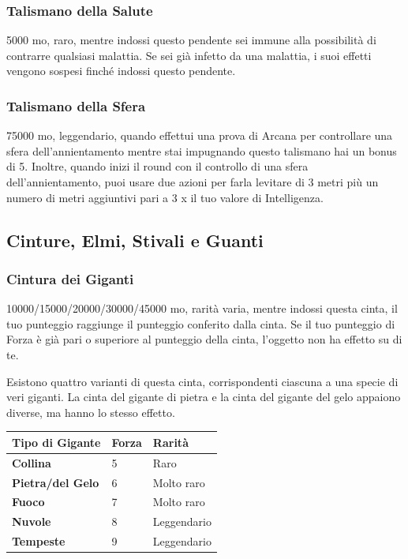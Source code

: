 \begin{multicols}{2}
\subsubsection*{Talismano della Salute}
5000 mo, raro, mentre indossi questo pendente sei immune alla possibilità di contrarre qualsiasi malattia. Se sei già infetto da una malattia, i suoi effetti vengono sospesi finché indossi questo pendente.

\subsubsection*{Talismano della Sfera}
75000 mo, leggendario, quando effettui una prova di Arcana per controllare una sfera dell'annientamento mentre stai impugnando questo talismano hai un bonus di 5. Inoltre, quando inizi il round con il controllo di una sfera dell'annientamento, puoi usare due azioni per farla levitare di 3 metri più un numero di metri aggiuntivi pari a 3 x il tuo valore di Intelligenza.

\subsection{Cinture, Elmi, Stivali e Guanti}

\subsubsection*{Cintura dei Giganti}

10000/15000/20000/30000/45000 mo, rarità varia, mentre indossi questa cinta, il tuo punteggio raggiunge il punteggio conferito dalla cinta. Se il tuo punteggio di Forza è già pari o superiore al punteggio della cinta, l'oggetto non ha effetto su di te.

Esistono quattro varianti di questa cinta, corrispondenti ciascuna a una specie di veri giganti. La cinta del gigante di pietra e la cinta del gigante del gelo appaiono diverse, ma hanno lo stesso effetto.

\medskip

\begin{tabular}{lll}
\textbf{Tipo di Gigante}& \textbf{Forza} &\textbf{Rarità}\\
\hline
\textbf{Collina} &5& Raro\\
\textbf{Pietra/del Gelo}& 6 &Molto raro\\
\textbf{Fuoco} &7& Molto raro\\
\textbf{Nuvole} &8& Leggendario\\
\textbf{Tempeste}& 9& Leggendario\\
\end{tabular}


\end{multicols}
